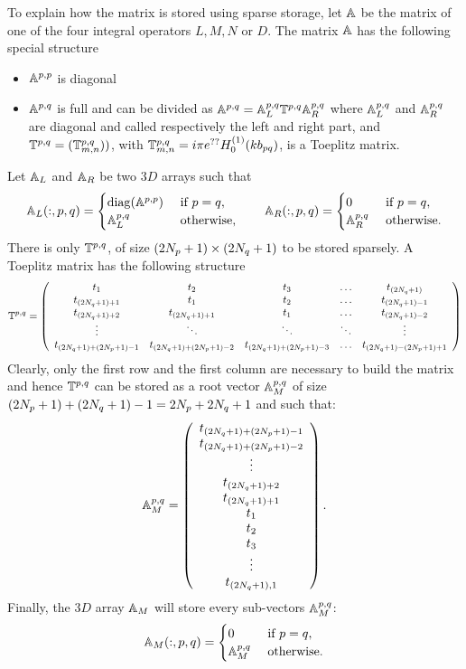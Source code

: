 To explain how the matrix is stored using \mudiff sparse storage, let ${\mathbb{A}}$ be the matrix of one of the four integral operators $L,M,N$ or $D$. The matrix ${\mathbb{A}}$ has the following special structure
\begin{itemize}
\item $\mathbb{A}^{p,p}$ is diagonal
\item $\mathbb{A}^{p,q}$ is full and can be divided as $\mathbb{A}^{p,q} = {\mathbb{A}}_L^{p,q}\mathbb{T}^{p,q}{\mathbb{A}}_R^{p,q}$ where ${\mathbb{A}}_L^{p,q}$ and ${\mathbb{A}}_R^{p,q}$ are diagonal and called respectively the left and right part, and $\mathbb{T}^{p,q} = (\mathbb{T}^{p,q}_{m,n}))$, with $\mathbb{T}^{p,q}_{m,n} = i\pi e^{??}H_0^{(1)}(kb_{pq})$, is a Toeplitz matrix.
\end{itemize}

Let ${\mathbb{A}}_L$ and ${\mathbb{A}}_R$ be two $3D$ arrays such that
$$
{\mathbb{A}}_L(:,p,q) = \begin{cases}
{\rm diag}(\mathbb{A}^{p,p}) & \text{ if }p=q,\\
{\mathbb{A}}_L^{p,q} & \text{ otherwise,}
\end{cases}\qquad
{\mathbb{A}}_R(:,p,q) = \begin{cases}
0 & \text{ if }p=q,\\
{\mathbb{A}}_R^{p,q} & \text{ otherwise.}
\end{cases}
$$
There is only $\mathbb{T}^{p,q}$, of size $(2N_{p}+1) \times (2N_{q}+1)$ to be stored sparsely. A Toeplitz matrix has the following structure
$$
\mathbb{T}^{p,q} = \left(\begin{array}{c c c c c}
t_1 & t_2 & t_3 & \ldots & t_{(2N_{q}+1)} \\
t_{(2N_{q}+1)+1} & t_{1} & t_{2} & \ldots & t_{(2N_{q}+1)-1}\\
t_{(2N_{q}+1)+2} & t_{(2N_{q}+1)+1} & t_{1} & \ldots & t_{(2N_{q}+1)-2}\\
\vdots & \ddots & \ddots& \ddots& \vdots\\
t_{(2N_{q}+1)+(2N_{p}+1)-1} & t_{(2N_{q}+1)+(2N_{p}+1)-2} & t_{(2N_{q}+1)+(2N_{p}+1)-3} &   \ldots  & t_{(2N_{q}+1)-(2N_{p}+1)+1}
\end{array}\right)
$$
Clearly, only the first row and the first column are necessary to build the matrix and hence $\mathbb{T}^{p,q}$ can be stored as a root vector ${\mathbb{A}}_M^{p,q}$ of size $(2N_{p}+1)+ (2N_{q}+1)-1 = 2N_{p} +2N_{q}+1$ and such that:
$$
{\mathbb{A}}_M^{p,q} = \left(\begin{array}{c}
t_{(2N_{q}+1)+(2N_{p}+1)-1}\\
t_{(2N_{q}+1)+(2N_{p}+1)-2}\\
\vdots\\
t_{(2N_{q}+1)+2}\\
t_{(2N_{q}+1)+1}\\
t_{1}\\
t_{2}\\
t_{3} \\
\vdots\\
t_{(2N_{q}+1), 1}\\
\end{array}\right).
$$
Finally, the $3D$ array ${\mathbb{A}}_M$ will store every sub-vectors ${\mathbb{A}}_M^{p,q}$:
$$
{\mathbb{A}}_M(:,p,q) = \begin{cases}
0 & \text{ if }p=q,\\
{\mathbb{A}}_M^{p,q} & \text{ otherwise.}
\end{cases}
$$

